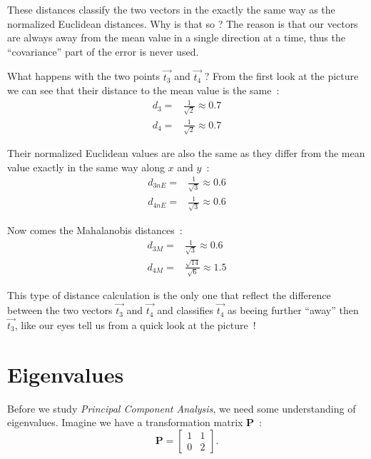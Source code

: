 \documentclass[11pt,twocolumn]{amsart} %
\begin{document}
These distances classify the two vectors in the exactly the same way as the normalized Euclidean distances. Why is that so ? The reason is that our vectors are always away from the mean value in a single direction at a time, thus the ``covariance'' part of the error is never used.

What happens with the two points $\vec{t_3}$ and $\vec{t_4}$ ? From the first look at the picture we can see that their distance to the mean value is the same~:
\begin{align*}
  d_3 = & \frac{1}{\sqrt{2}} \approx 0.7 \\
  d_4 = & \frac{1}{\sqrt{2}} \approx 0.7
\end{align*}

Their normalized Euclidean values are also the same as they differ from the mean value exactly in the same way along $x$ and $y$~:
\begin{align*}
  d_{3nE} = & \frac{1}{\sqrt{3}} \approx 0.6\\
  d_{4nE} = & \frac{1}{\sqrt{3}} \approx 0.6
\end{align*}

Now comes the Mahalanobis distances~:
\begin{align*}
  d_{3M} = & \frac{1}{\sqrt{3}} \approx 0.6\\
  d_{4M} = & \frac{\sqrt{14}}{\sqrt{6}} \approx 1.5
\end{align*}

This type of distance calculation is the only one that reflect the difference between the two vectors $\vec{t_3}$ and $\vec{t_4}$ and classifies $\vec{t_4}$ as beeing further ``away'' then $\vec{t_3}$, like our eyes tell us from a quick look at the picture~!

\section{Eigenvalues}

Before we study \emph{Principal Component Analysis}, we need some understanding of eigenvalues. Imagine we have a transformation matrix \textbf{P}~:
\begin{equation*}
  \textbf{P} = \begin{bmatrix} 1 & 1 \\ 0 & 2 \end{bmatrix}.
\end{equation*}
\end{document}

